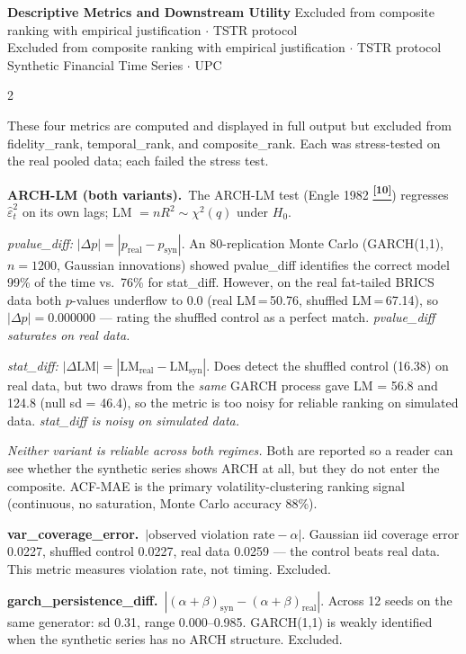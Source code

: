 \documentclass[10pt]{article}
\newcommand{\amberbox}[2]{\begin{tcolorbox}[mybox={Amber}{ABg},title={#1}]#2\end{tcolorbox}}
\newcommand{\pagehead}[2]{%
  \begin{tcolorbox}[enhanced,arc=0pt,outer arc=0pt,boxrule=0pt,
    colback=Navy,colframe=Navy,
    top=5pt,bottom=5pt,left=8pt,right=8pt,
    before skip=0pt,after skip=10pt]
  {\color{white}\large\bfseries #1}%
  \ifx\relax#2\relax\else\\[1pt]{\color{blue!30!white}\small #2}\fi
  \hfill{\color{blue!20!white}\footnotesize Synthetic Financial Time Series $\cdot$ UPC}
  \end{tcolorbox}}
\newcommand{\tcite}[1]{%
  \hyperlink{R:#1}{\textsuperscript{\scriptsize\textbf{[#1]}}}}
\begin{document}
\clearpage

\pagehead{Descriptive Metrics and Downstream Utility}
         {Excluded from composite ranking with empirical justification $\cdot$ TSTR protocol}

\begin{multicols}{2}

\amberbox{\textbf{Descriptive Group} --- Reported but Not Ranked}{%
These four metrics are computed and displayed in full output but excluded from fidelity\_rank, temporal\_rank, and composite\_rank. Each was stress-tested on the real pooled data; each failed the stress test.

\smallskip
\textbf{ARCH-LM (both variants).}\ The ARCH-LM test (Engle 1982\tcite{10}) regresses $\hat{\varepsilon}^2_t$ on its own lags; LM $= n R^2 \sim \chi^2(q)$ under $H_0$.

\textit{pvalue\_diff:} $|\Delta p| = |p_\text{real} - p_\text{syn}|$. An 80-replication Monte Carlo (GARCH(1,1), $n=1200$, Gaussian innovations) showed pvalue\_diff identifies the correct model 99\% of the time vs.\ 76\% for stat\_diff. However, on the real fat-tailed BRICS data both $p$-values underflow to 0.0 (real LM\,=\,50.76, shuffled LM\,=\,67.14), so $|\Delta p| = 0.000000$ --- rating the shuffled control as a perfect match. \textit{pvalue\_diff saturates on real data.}

\textit{stat\_diff:} $|\Delta \text{LM}| = |\text{LM}_\text{real} - \text{LM}_\text{syn}|$. Does detect the shuffled control (16.38) on real data, but two draws from the \emph{same} GARCH process gave LM = 56.8 and 124.8 (null sd = 46.4), so the metric is too noisy for reliable ranking on simulated data. \textit{stat\_diff is noisy on simulated data.}

\textit{Neither variant is reliable across both regimes.} Both are reported so a reader can see whether the synthetic series shows ARCH at all, but they do not enter the composite. ACF-MAE is the primary volatility-clustering ranking signal (continuous, no saturation, Monte Carlo accuracy 88\%).

\smallskip
\textbf{var\_coverage\_error.}\ $|\text{observed violation rate} - \alpha|$. Gaussian iid coverage error 0.0227, shuffled control 0.0227, real data 0.0259 --- the control beats real data. This metric measures violation rate, not timing. Excluded.

\smallskip
\textbf{garch\_persistence\_diff.}\ $|(\alpha+\beta)_\text{syn} - (\alpha+\beta)_\text{real}|$. Across 12 seeds on the same generator: sd 0.31, range 0.000--0.985. GARCH(1,1) is weakly identified when the synthetic series has no ARCH structure. Excluded.

}
\end{multicols}
\end{document}
